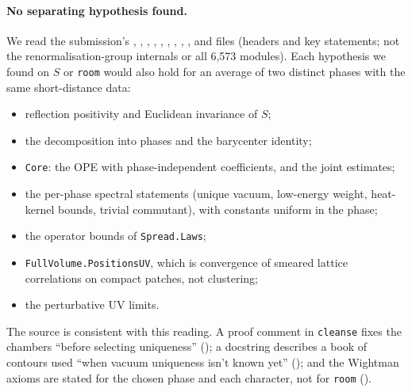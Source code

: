 \documentclass[11pt,a4paper]{article}
\newcommand{\lean}[1]{\texttt{#1}}
\theoremstyle{plain}
\begin{document}
\paragraph{No separating hypothesis found.} We read the submission's , , , , , , , , ,  and  files (headers and key statements; not the renormalisation-group internals or all 6,573 modules). Each hypothesis we found on $S$ or \lean{room} would also hold for an average of two distinct phases with the same short-distance data:
\begin{itemize}
\item reflection positivity and Euclidean invariance of $S$;
\item the decomposition into phases and the barycenter identity;
\item \lean{Core}: the OPE with phase-independent coefficients, and the joint estimates;
\item the per-phase spectral statements (unique vacuum, low-energy weight, heat-kernel bounds, trivial commutant), with constants uniform in the phase;
\item the operator bounds of \lean{Spread.Laws};
\item \lean{FullVolume.PositionsUV}, which is convergence of smeared lattice correlations on compact patches, not clustering;
\item the perturbative UV limits.
\end{itemize}
The source is consistent with this reading. A proof comment in \lean{cleanse} fixes the chambers ``before selecting uniqueness'' (); a docstring describes a book of contours used ``when vacuum uniqueness isn't known yet'' (); and the Wightman axioms are stated for the chosen phase and each character, not for \lean{room} ().
\end{document}
